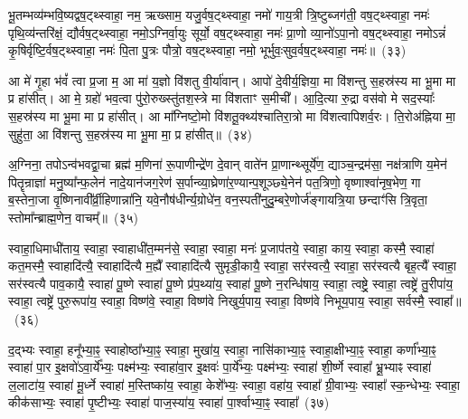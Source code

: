 {\anuvakamend[{उप॒ ग्रह॒मिडा॑मा॒शिषो॒ द्वात्रिꣳ॑शच्च}]}%

भू॒तम्भव्य॑म्भवि॒ष्यद्वष॒ट्थ्स्वाहा॒ नम॒ ऋख्साम॒ यजु॒र्वष॒ट्थ्स्वाहा॒ नमो॑ गाय॒त्री त्रि॒ष्टुब्जग॑ती॒ वष॒ट्थ्स्वाहा॒ नमः॑ पृथि॒व्य॑न्तरि॑क्षं॒ द्यौर्वष॒ट्थ्स्वाहा॒ नमो॒\-ऽग्निर्वा॒युः सूर्यो॒ वष॒ट्थ्स्वाहा॒ नमः॑ प्रा॒णो व्या॒नो॑\-ऽपा॒नो वष॒ट्थ्स्वाहा॒ नमो\-ऽन्नं॑ कृ॒षिर्वृष्टि॒र्वष॒ट्थ्स्वाहा॒ नमः॑ पि॒ता पु॒त्रः पौत्रो॒ वष॒ट्थ्स्वाहा॒ नमो॒ भूर्भुवः॒सुव॒र्वष॒ट्थ्स्वाहा॒ नमः॑॥~(३३)

{\anuvakamend[{भुव॑श्च॒त्वारि॑ च}]}%

आ मे॑ गृ॒हा भ॑वं᳚ त्वा प्र॒जा म॒ आ मा॑ य॒ज्ञो वि॑शतु वी॒र्या॑वान्। आपो॑ दे॒वीर्य॒ज्ञिया॒ मा वि॑शन्तु स॒हस्र॑स्य मा भू॒मा मा प्र हा॑सीत्। आ मे॒ ग्रहो॑ भव॒त्वा पु॑रो॒रुख्स्तु॑तश॒स्त्रे मा वि॑शताꣳ स॒मीची᳚। आ॒दि॒त्या रु॒द्रा वस॑वो मे सद॒स्याः᳚ स॒हस्र॑स्य मा भू॒मा मा प्र हा॑सीत्। आ मा᳚ग्निष्टो॒मो वि॑शतू॒क्थ्य॑श्चातिरा॒त्रो मा वि॑शत्वापिशर्व॒रः। ति॒रोअ॑ह्निया मा॒ सुहु॑ता॒ आ वि॑शन्तु स॒हस्र॑स्य मा भू॒मा मा॒ प्र हा॑सीत्॥~(३४)

{\anuvakamend[{अ॒ग्नि॒ष्टो॒मो वि॑शत्व॒ष्टाद॑श च}]}%

अ॒ग्निना॒ तपो\-ऽन्व॑भवद्वा॒चा ब्रह्म॑ म॒णिना॑ रू॒पाणीन्द्रे॑ण दे॒वान् वाते॑न प्रा॒णान्थ्सूर्ये॑ण॒ द्याञ्च॒न्द्रम॑सा॒ नक्ष॑त्राणि य॒मेन॑ पितॄन्राज्ञा॑ मनु॒ष्या᳚न्फ॒लेन॑ नादे॒यान॑जग॒रेण॑ स॒र्पान्व्या॒घ्रेणा॑र॒ण्यान्प॒शूञ्छ्ये॒नेन॑ पत॒त्रिणो॒ वृष्णाश्वा॑नृष॒भेण॒ गा ब॒स्तेना॒जा वृ॒ष्णिनावी᳚र्व्री॒हिणान्ना॑नि॒ यवे॒नौष॑धीर्न्य॒ग्रोधे॑न॒ वन॒स्पती॑नुदु॒म्बरे॒णोर्ज॑ङ्गायत्रि॒या छन्दाꣳ॑सि त्रि॒वृता॒ स्तोमा᳚न्ब्राह्म॒णेन॒ वाचम्᳚॥~(३५)

{\anuvakamend[{ब्रा॒ह्म॒णेनैक॑ञ्च}]}%

स्वाहा॒धिमाधी॑ताय॒ स्वाहा॒ स्वाहाधी॑त॒म्मन॑से॒ स्वाहा॒ स्वाहा॒ मनः॑ प्र॒जाप॑तये॒ स्वाहा॒ काय॒ स्वाहा॒ कस्मै॒ स्वाहा॑ कत॒मस्मै॒ स्वाहादि॑त्यै॒ स्वाहादि॑त्यै म॒ह्यै᳚ स्वाहादि॑त्यै सुमृडी॒कायै॒ स्वाहा॒ सर॑स्वत्यै॒ स्वाहा॒ सर॑स्वत्यै बृह॒त्यै᳚ स्वाहा॒ सर॑स्वत्यै पाव॒कायै॒ स्वाहा॑ पू॒ष्णे स्वाहा॑ पू॒ष्णे प्र॑प॒थ्या॑य॒ स्वाहा॑ पू॒ष्णे न॒रन्धि॑षाय॒ स्वाहा॒ त्वष्ट्रे॒ स्वाहा॒ त्वष्ट्रे॑ तु॒रीपा॑य॒ स्वाहा॒ त्वष्ट्रे॑ पुरु॒रूपा॑य॒ स्वाहा॒ विष्ण॑वे॒ स्वाहा॒ विष्ण॑वे निखुर्य॒पाय॒ स्वाहा॒ विष्ण॑वे निभूय॒पाय॒ स्वाहा॒ सर्वस्मै॒ स्वाहा᳚॥~(३६)

{\anuvakamend[{पु॒रु॒रूपा॑य॒ स्वाहा॒ दश॑ च}]}%

द॒द्भ्यः स्वाहा॒ हनू᳚भ्या॒ꣴ॒ स्वाहोष्ठा᳚भ्या॒ꣴ॒ स्वाहा॒ मुखा॑य॒ स्वाहा॒ नासि॑काभ्या॒ꣴ॒ स्वाहा॒क्षीभ्या॒ꣴ॒ स्वाहा॒ कर्णा᳚भ्या॒ꣴ॒ स्वाहा॑ पा॒र इ॒क्षवो॑\-ऽवा॒र्ये᳚भ्यः॒ पक्ष्म॑भ्यः॒ स्वाहा॑वा॒र इ॒क्षवः॑ पा॒र्ये᳚भ्यः॒ पक्ष्म॑भ्यः॒ स्वाहा॑ शी॒र्\mbox{}ष्णे स्वाहा᳚ भ्रू॒भ्याꣴ स्वाहा॑ ल॒लाटा॑य॒ स्वाहा॑ मू॒र्ध्ने स्वाहा॑ म॒स्तिष्का॑य॒ स्वाहा॒ केशे᳚भ्यः॒ स्वाहा॒ वहा॑य॒ स्वाहा᳚ ग्री॒वाभ्यः॒ स्वाहा᳚ स्क॒न्धेभ्यः॒ स्वाहा॒ कीक॑साभ्यः॒ स्वाहा॑ पृ॒ष्टीभ्यः॒ स्वाहा॑ पाज॒स्या॑य॒ स्वाहा॑ पा॒र्श्वाभ्या॒ꣴ॒ स्वाहा᳚~(३७)

